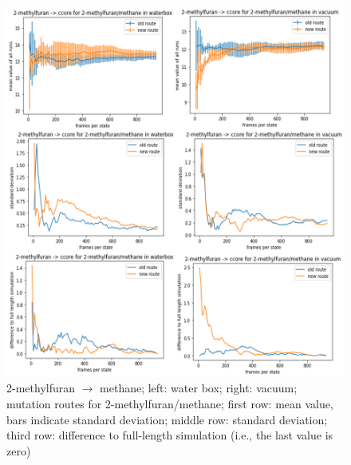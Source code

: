 \begin{figure}[!htb]
	
	\includegraphics[scale=0.9]{methylfuran_short} \caption{2-methylfuran $\mathrm{\rightarrow}$ methane; left: water box; right: vacuum;  mutation routes for 2-methylfuran/methane; first row: mean value, bars indicate standard deviation; middle row: standard deviation; third row: difference to full-length simulation (i.e., the last value is zero)}
	\label{fig:methylfuran_short}
\end{figure}


